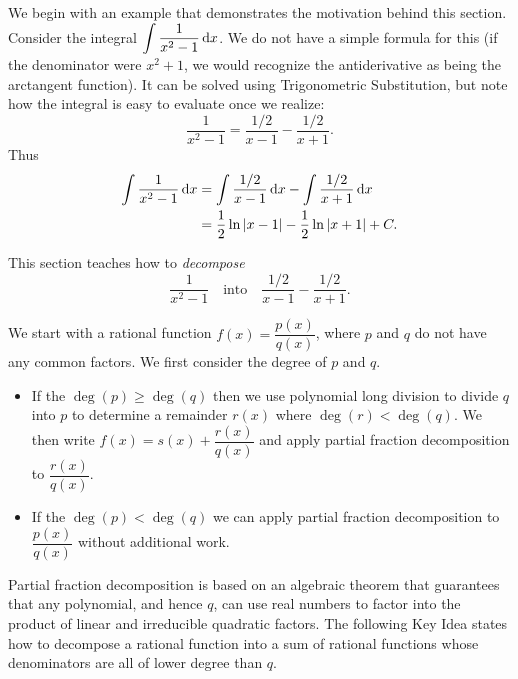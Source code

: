 We begin with an example that demonstrates the motivation behind this section. Consider the integral $\displaystyle\int \frac{1}{x^2-1}\operatorname{d}\! x$. We do not have a simple formula for this (if the denominator were $x^2+1$, we would recognize the antiderivative as being the arctangent function). It can be solved using Trigonometric Substitution, but note how the integral is easy to evaluate once we realize:
%
\[\frac{1}{x^2-1} = \frac{1/2}{x-1} - \frac{1/2}{x+1}.\]
Thus 
\begin{align*}
\int\frac{1}{x^2-1}\operatorname{d}\! x &= \int\frac{1/2}{x-1}\operatorname{d}\! x - \int\frac{1/2}{x+1}\operatorname{d}\! x \\
			&= \frac12\ln\left\lvert x-1 \right\rvert-\frac12\ln\left\lvert x+1 \right\rvert+C.
\end{align*}

This section teaches how to \emph{decompose}
\[\frac1{x^2-1}\quad  \text{into}\quad  \frac{1/2}{x-1}-\frac{1/2}{x+1}.\]

We start with a rational function $f(x)=\dfrac{p(x)}{q(x)}$, where $p$ and $q$ do not have any common factors. We first consider the degree of $p$ and $q$. 
\begin{itemize}
	\item If the $\deg(p)\ge\deg(q)$ then we use polynomial long division to divide $q$ into $p$ to determine a remainder $r(x)$ where $\deg(r)<\deg(q)$. We then write $f(x) =s(x)+\dfrac{r(x)}{q(x)}$ and apply partial fraction decomposition to $\dfrac{r(x)}{q(x)}$.
	\item If the $\deg(p)<\deg(q)$ we can apply partial fraction decomposition to $\dfrac{p(x)}{q(x)}$ without additional work.
\end{itemize}

Partial fraction decomposition is based on an algebraic theorem that guarantees that any polynomial, and hence $q$, can use real numbers to factor into the product of linear and irreducible quadratic factors.
The following Key Idea states how to decompose a rational function into a sum of rational functions whose denominators are all of lower degree than $q$.


